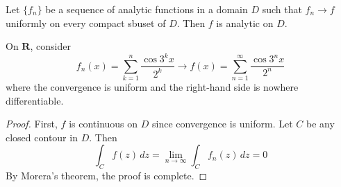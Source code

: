 \vspace{2ex}
\begin{thm}
Let $\{f_{n}\}$ be a sequence of analytic functions in a domain $D$ such that $f_{n}\rightarrow f$ uniformly on every compact sbuset of $D$. Then $f$ is analytic on $D$. 
\end{thm}
\vspace{2ex}
\begin{ex}
On ${\bm R}$, consider
\[f_{n}(x)=\sum ^{n}_{k=1}\dfrac{\cos 3^{k}x}{2^{k}}\rightarrow f(x)=\sum ^{\infty }_{n=1}\dfrac{\cos 3^{n}x}{2^{n}}\]
where the convergence is uniform and the right-hand side is nowhere differentiable.
\end{ex}
\vspace{2ex}
\begin{proof}
First, $f$ is continuous on $D$ since convergence is uniform. Let $C$ be any closed contour in $D$. Then 
	\[\int _{C}f(z)\,dz=\lim _{n\rightarrow \infty }\int _{C}f_{n}(z)\,dz=0\]
By Morera's theorem, the proof is complete. 
\end{proof}
\vspace{2ex}

